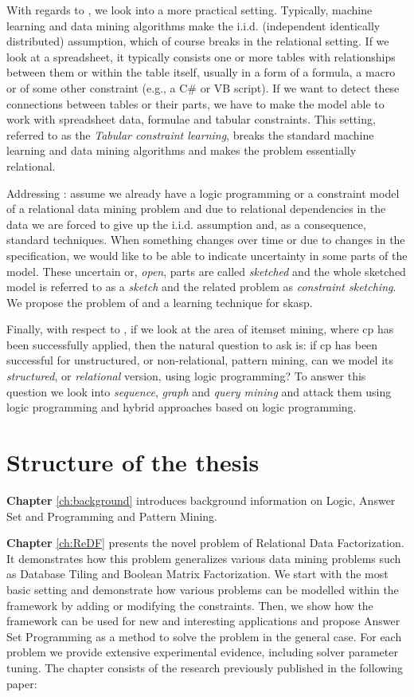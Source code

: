 With regards to \ctwo, we look into a more practical setting.
Typically, machine learning and data mining algorithms make the i.i.d.
(independent identically distributed) assumption, which of course
breaks in the relational setting. If we look at a spreadsheet, it 
typically consists one or more tables with relationships between them or
within the table itself, usually
in a form of a formula, a macro or of some other constraint (e.g., a
C\# or VB script). If we
want to detect these connections between tables or their parts, we
have to make the model able to work with spreadsheet data, 
formulae and tabular constraints. This setting, referred to as the
\textit{Tabular constraint learning}, breaks the standard
machine learning and data mining algorithms and 
makes the problem essentially relational.

Addressing \cthree: assume we already have a logic programming or a
constraint model of a relational
data mining problem and due to relational dependencies in the data we are
forced to give up the i.i.d. assumption and, as a consequence,
standard techniques. When something changes over time or due to changes in the specification, we would like
to be able to indicate uncertainty in some parts of the model. These
uncertain or, \textit{open}, parts are called \textit{sketched} and
the whole sketched model is referred to as a \textit{sketch} and the related
problem as \textit{constraint sketching}. We propose the problem of and
a learning technique for \acrlong{skasp}.


Finally, with respect to \cfour, if we look at the area of itemset mining, where \acrlong{cp}
has been successfully applied, then the natural question to ask is:
if \acrshort{cp} has been successful for unstructured, or
non-relational, pattern mining, can we model its \textit{structured},
or \textit{relational} version, using logic programming? To answer
this question we look into \textit{sequence}, \textit{graph} and
\textit{query mining} and attack them using logic programming and
hybrid approaches based on logic programming.


\section{Structure of the thesis}
\textbf{Chapter} \ref{ch:background} introduces background information
on Logic, Answer Set and Programming and Pattern Mining.

\textbf{Chapter} \ref{ch:ReDF} presents the novel problem of Relational Data
Factorization. It demonstrates how this problem generalizes various
data mining problems such as Database Tiling and Boolean Matrix
Factorization. We start with the most basic setting and demonstrate
how various problems can be modelled within the framework by adding
or modifying the constraints. Then, we show how the framework can be
used for new and interesting applications and propose Answer Set
Programming as a method to solve the problem in the general case.
For each problem we provide extensive experimental evidence,
including solver parameter tuning. The chapter consists of the
research previously published in the following paper:

